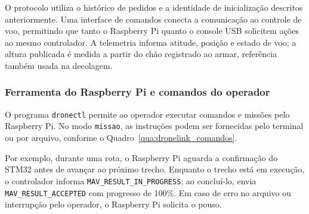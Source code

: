O protocolo utiliza o histórico de pedidos e a identidade de inicialização descritos anteriormente. Uma interface de comandos conecta a comunicação ao controle de voo, permitindo que tanto o Raspberry Pi quanto o console USB solicitem ações ao mesmo controlador. A telemetria informa atitude, posição e estado de voo; a altura publicada é medida a partir do chão registrado ao armar, referência também usada na decolagem.

\subsubsection{Ferramenta do Raspberry Pi e comandos do operador}\label{subsubsec:com_comandos}

O programa \texttt{dronectl} permite ao operador executar comandos e missões pelo Raspberry Pi. No modo \texttt{missao}, as instruções podem ser fornecidas pelo terminal ou por arquivo, conforme o Quadro~\ref{qua:dronelink_comandos}.

Por exemplo, durante uma rota, o Raspberry Pi aguarda a confirmação do STM32 antes de avançar ao próximo trecho. Enquanto o trecho está em execução, o controlador informa \texttt{MAV\_RESULT\_IN\_PROGRESS}; ao concluí-lo, envia \texttt{MAV\_RESULT\_ACCEPTED} com progresso de 100\%. Em caso de erro no arquivo ou interrupção pelo operador, o Raspberry Pi solicita o pouso.




